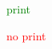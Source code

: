 \documentclass{classe-tex3R-2-1}
\begin{document}
\bigskip

\ifprint \textcolor{green}{print}\par \else \hfill \textcolor{red}{no} \textcolor{red}{print}\par \fi





\end{document}
